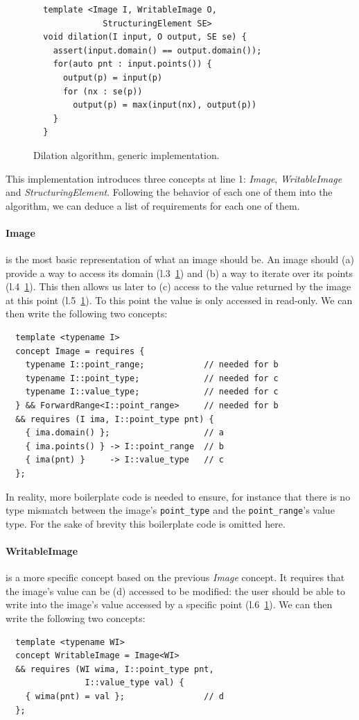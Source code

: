 \begin{figure}[tbh]
  \centering
  \begin{verbatim}
  template <Image I, WritableImage O,
              StructuringElement SE>
  void dilation(I input, O output, SE se) {
    assert(input.domain() == output.domain());
    for(auto pnt : input.points()) {
      output(p) = input(p)
      for (nx : se(p))
        output(p) = max(input(nx), output(p))
    }
  }
  \end{verbatim}
  \caption{Dilation algorithm, generic implementation.}
  \label{fig.gen.dilate}
\end{figure}

This implementation introduces three concepts at line 1: \emph{Image}, \emph{WritableImage} and
\emph{StructuringElement}. Following the behavior of each one of them into the algorithm, we can deduce a list of
requirements for each one of them.

\paragraph{Image} is the most basic representation of what an image should be. An image should (a) provide a way to
access its domain (l.3~\ref{fig.gen.dilate}) and (b) a way to iterate over its points (l.4~\ref{fig.gen.dilate}). This
then allows us later to (c) access to the value returned by the image at this point (l.5~\ref{fig.gen.dilate}). To this
point the value is only accessed in read-only. We can then write the following two concepts:
\begin{verbatim}
  template <typename I>
  concept Image = requires {
    typename I::point_range;            // needed for b
    typename I::point_type;             // needed for c
    typename I::value_type;             // needed for c
  } && ForwardRange<I::point_range>     // needed for b
  && requires (I ima, I::point_type pnt) {
    { ima.domain() };                   // a
    { ima.points() } -> I::point_range  // b
    { ima(pnt) }     -> I::value_type   // c
  };
\end{verbatim}
In reality, more boilerplate code is needed to ensure, for instance that there is no type mismatch between the image's
\texttt{point\_type} and the \texttt{point\_range}'s value type. For the sake of brevity this boilerplate code is
omitted here.

\paragraph{WritableImage} is a more specific concept based on the previous \emph{Image} concept. It requires that the
image's value can be (d) accessed to be modified: the user should be able to write into the image's value accessed by a
specific point (l.6~\ref{fig.gen.dilate}). We can then write the following two concepts:
\begin{verbatim}
  template <typename WI>
  concept WritableImage = Image<WI>
  && requires (WI wima, I::point_type pnt,
                I::value_type val) {
    { wima(pnt) = val };                // d
  };
\end{verbatim}

